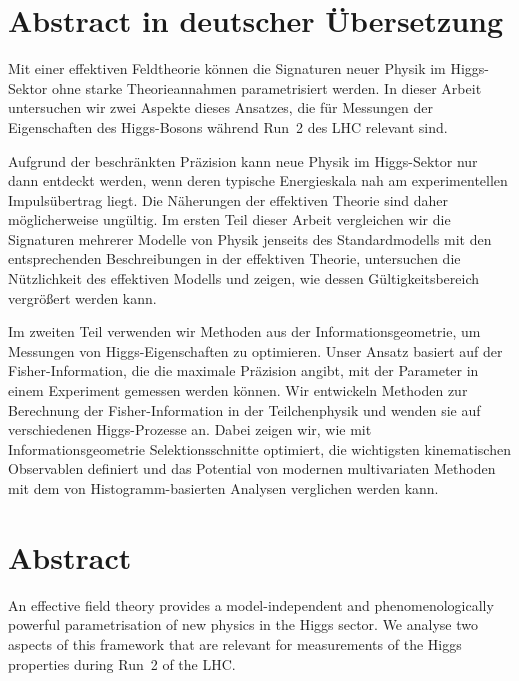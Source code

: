 

\chapter*{Abstract in deutscher \"{U}bersetzung}

Mit einer effektiven Feldtheorie k\"onnen die Signaturen neuer Physik
im Higgs-Sektor ohne starke Theorieannahmen parametrisiert werden. In
dieser Arbeit untersuchen wir zwei Aspekte dieses Ansatzes, die f\"ur
Messungen der Eigenschaften des Higgs-Bosons w\"ahrend Run~2 des LHC
relevant sind.

Aufgrund der beschr\"ankten Pr\"azision kann neue Physik im
Higgs-Sektor nur dann entdeckt werden, wenn deren typische
Energieskala nah am experimentellen Impuls\"ubertrag liegt. Die
N\"aherungen der effektiven Theorie sind daher m\"oglicherweise
ung\"ultig. Im ersten Teil dieser Arbeit vergleichen wir die
Signaturen mehrerer Modelle von Physik jenseits des Standardmodells
mit den entsprechenden Beschreibungen in der effektiven Theorie,
untersuchen die N\"utzlichkeit des effektiven Modells und
zeigen, wie dessen G\"ultigkeitsbereich vergr\"o\ss{}ert werden
kann.

Im zweiten Teil verwenden wir Methoden aus der Informationsgeometrie,
um Messungen von Higgs-Eigenschaften zu optimieren. Unser Ansatz
basiert auf der Fisher-Information, die die maximale Pr\"azision
angibt, mit der Parameter in einem Experiment gemessen werden
k\"onnen. Wir entwickeln Methoden zur Berechnung der
Fisher-Information in der Teilchenphysik und wenden sie auf
verschiedenen Higgs-Prozesse an. Dabei zeigen wir, wie mit
Informationsgeometrie Selektionsschnitte optimiert, die wichtigsten
kinematischen Observablen definiert und das Potential von modernen
multivariaten Methoden mit dem von Histogramm-basierten Analysen
verglichen werden kann.




\chapter*{Abstract}

An effective field theory provides a model-independent and
phenomenologically powerful parametrisation of new physics in the
Higgs sector. We analyse two aspects of this framework that are
relevant for measurements of the Higgs properties during Run~2 of the
LHC.

